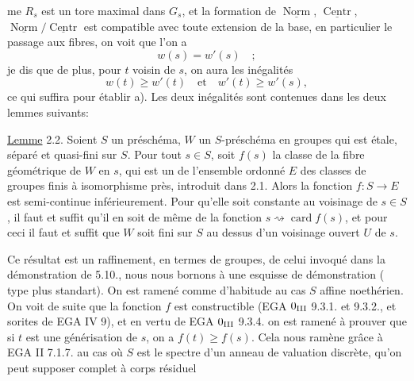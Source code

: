 
me $R_s$ est un tore maximal dans $G_s$, et la formation de $\underline{\operatorname{Norm}}$, $\underline{\operatorname{Centr}}$, $\underline{\operatorname{Norm}}/\underline{\operatorname{Centr}}$ est compatible avec toute extension de la base, en particulier le passage aux fibres, on voit que l'on a
\[
w(s)=w'(s)\quad;
\]
je dis que de plus, pour $t$ voisin de $s$, on aura les inégalités
\[
w(t)\geq w'(t)\quad\text{et}\quad w'(t)\geq w'(s),
\]
ce qui suffira pour établir a).  Les deux inégalités  sont contenues dans les deux lemmes suivants:

\uline{Lemme} 2.2. Soient $S$ un préschéma, $W$ un $S$-préschéma en groupes qui est étale,  séparé et quasi-fini sur $S$. Pour tout $s\in S$, soit $f(s)$ la classe de la fibre géométrique de $W$ en $s$, qui est un  de l'ensemble ordonné $E$ des classes de groupes finis à isomorphisme près, introduit dans 2.1. Alors la fonction $f:S\longrightarrow E$ est semi-continue inférieurement. Pour qu'elle soit constante au voisinage de $s\in S$,  il faut et suffit qu'il en soit de même de la fonction $s\rightsquigarrow\operatorname{card}f(s)$, et pour ceci il faut et suffit que $W$ soit fini sur $S$ au dessus d'un voisinage ouvert $U$ de $s$.

Ce résultat est un raffinement, en termes de groupes, de celui invoqué dans la démonstration de  5.10., nous nous bornons à une esquisse de  démonstration ( type  plus standart). On est ramené comme d'habitude au cas $S$ affine noethérien. On voit de suite que la fonction $f$ est constructible (EGA  $0_{\rm III}$ 9.3.1. et 9.3.2., et sorites de EGA IV 9), et en vertu de EGA $0_{\rm III}$ 9.3.4. on est ramené  à prouver que si $t$ est une générisation de $s$, on a $f(t)\geq f(s)$. Cela nous ramène  grâce à EGA II 7.1.7. au cas où $S$ est le spectre d'un anneau de valuation discrète, qu'on peut supposer complet à corps résiduel
